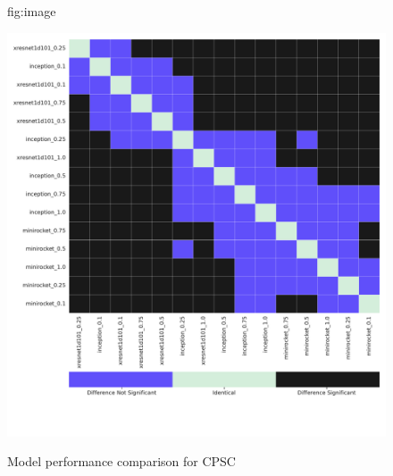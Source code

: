 \documentclass[pmlr,twocolumn]{jmlr}%
\begin{document}
\begin{figure}[htbp]
\floatconts
  {fig:image}
  {\caption{Model performance comparison for CPSC}}
  {\includegraphics[width=1\linewidth]{images/model_comparisons_CPSC2018.pdf}}
 
\end{figure}
\end{document}
